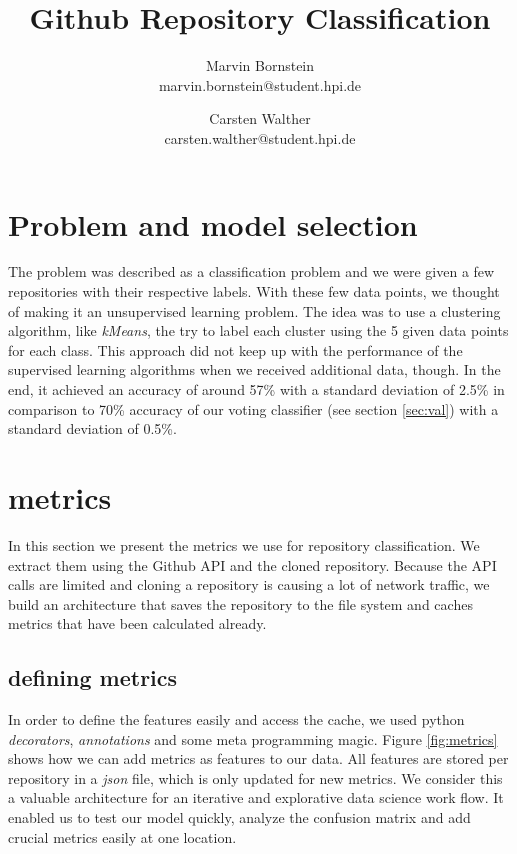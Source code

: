 \documentclass[a4paper]{scrartcl}
\title{Github Repository Classification}
\author{Marvin Bornstein\\ marvin.bornstein@student.hpi.de \and Carsten Walther\\ carsten.walther@student.hpi.de}
\begin{document}
\maketitle

\section{Problem and model selection} %
\label{sec:problem_and_model_selection}

The problem was described as a classification problem and we were given a few repositories with their respective labels. With these few data points, we thought of making it an unsupervised learning problem. The idea was to use a clustering algorithm, like \emph{kMeans}, the try to label each cluster using the 5 given data points for each class. This approach did not keep up with the performance of the supervised learning algorithms when we received additional data, though. In the end, it achieved an accuracy of around 57\% with a standard deviation of 2.5\% in comparison to 70\% accuracy of our voting classifier (see section \ref{sec:val}) with a standard deviation of 0.5\%.


\section{metrics} %
\label{sec:metrics}

In this section we present the metrics we use for repository classification. We extract them using the Github API and the cloned repository. Because the API calls are limited and cloning a repository is causing a lot of network traffic, we build an architecture that saves the repository to the file system and caches metrics that have been calculated already.

	\subsection{defining metrics} %
	\label{sub:defining_metrics}
	
	In order to define the features easily and access the cache, we used python \emph{decorators}, \emph{annotations} and some meta programming magic. Figure \ref{fig:metrics} shows how we can add metrics as features to our data. All features are stored per repository in a \emph{json} file, which is only updated for new metrics. We consider this a valuable architecture for an iterative and explorative data science work flow. It enabled us to test our model quickly, analyze the confusion matrix and add crucial metrics easily at one location.
\end{document}
